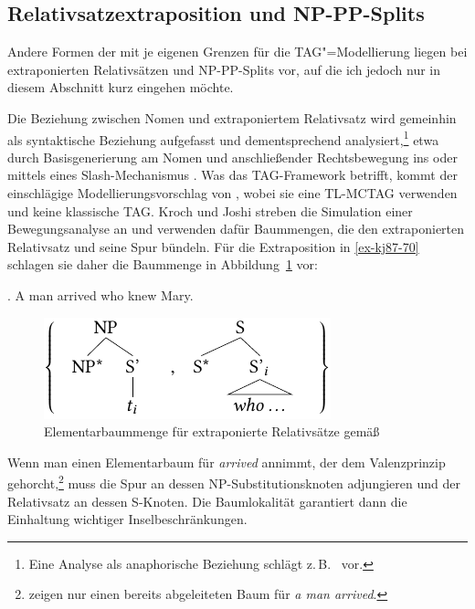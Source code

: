 \subsection{Relativsatzextraposition und NP-PP-Splits} \label{sec-tag-grenzen-wellnest}

Andere Formen der  mit je eigenen Grenzen für die TAG"=Modellierung liegen bei extraponierten Relativsätzen und NP-PP-Splits vor, auf die ich jedoch nur in diesem Abschnitt kurz eingehen möchte. %

Die Beziehung zwischen Nomen und extraponiertem Relativsatz wird gemeinhin als syntaktische Beziehung aufgefasst und dementsprechend analysiert,\footnote{Eine Analyse als anaphorische Beziehung schlägt z.\,B.\ \cite{Kiss:05} vor.} etwa durch Basisgenerierung am Nomen und anschlie\ss ender Rechtsbewegung ins  \citep{Buering:Hartmann:97} oder mittels eines Slash-Mechanismus \citep{Pollard:Sag:94, Keller:95, Mueller:99}. Was das TAG-Framework betrifft, kommt der einschlägige Modellierungsvorschlag von \cite{Kroch:Joshi:87}, wobei sie eine TL-MCTAG verwenden und keine klassische TAG. Kroch und Joshi streben die Simulation einer Bewegungsanalyse an und verwenden dafür Baummengen, die den extraponierten Relativsatz und seine Spur bündeln. Für die Extraposition in \ref{ex-kj87-70} schlagen sie daher die Baummenge in Abbildung~\ref{fig-kj87-1} vor: 

\ex. \label{ex-kj87-70} A man arrived who knew Mary. \hfill \citep[(70)]{Kroch:Joshi:87}

\begin{figure}[t]
\centering
\includegraphics{graphics/abb517.pdf}
\caption{\label{fig-kj87-1}Elementarbaummenge für extraponierte Relativsätze gemä\ss\ \cite{Kroch:Joshi:87}}
\end{figure}


Wenn man einen Elementarbaum für {\it arrived} annimmt, der dem Valenzprinzip gehorcht,\footnote{\citet[(71)]{Kroch:Joshi:87} zeigen nur einen bereits abgeleiteten Baum für {\it a man arrived}.} muss die Spur an dessen NP-Substitutionsknoten adjungieren und der Relativsatz an dessen S-Knoten. Die Baumlokalität garantiert dann die Einhaltung wichtiger Inselbeschränkungen.  

